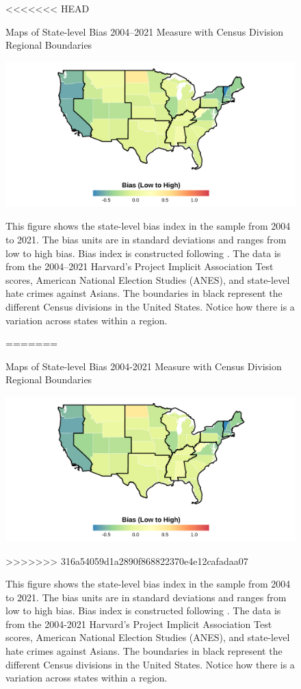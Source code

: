 \begin{center}
\begin{figure}[H]
<<<<<<< HEAD
\caption{Maps of State-level Bias 2004--2021 Measure with Census Division Regional Boundaries}
\includegraphics[width=\textwidth]{Average_Skinmap.png} 
\label{fig:iat-map-all}
\caption*{\footnotesize{This figure shows the state-level bias index in the sample from 2004 to 2021. The bias units are in standard deviations and ranges from low to high bias. Bias index is constructed following \textcite{lubotskyInterpretationRegressionsMultiple2006}. The data is from the 2004--2021 Harvard's Project Implicit Association Test scores, American National Election Studies (ANES), and state-level hate crimes against Asians. The boundaries in black represent the different Census divisions in the United States. Notice how there is a variation across states within a region.}}
=======
\caption{Maps of State-level Bias 2004-2021 Measure with Census Division Regional Boundaries}
\includegraphics[width=\textwidth]{Average_Skinmap.png} 
\label{fig:iat-map-all}
\caption*{\footnotesize{This figure shows the state-level bias index in the sample from 2004 to 2021. The bias units are in standard deviations and ranges from low to high bias. Bias index is constructed following \textcite{lubotskyInterpretationRegressionsMultiple2006}. The data is from the 2004-2021 Harvard's Project Implicit Association Test scores, American National Election Studies (ANES), and state-level hate crimes against Asians. The boundaries in black represent the different Census divisions in the United States. Notice how there is a variation across states within a region.}}
>>>>>>> 316a54059d1a2890f868822370e4e12cafadaa07
\end{figure}
\end{center}

